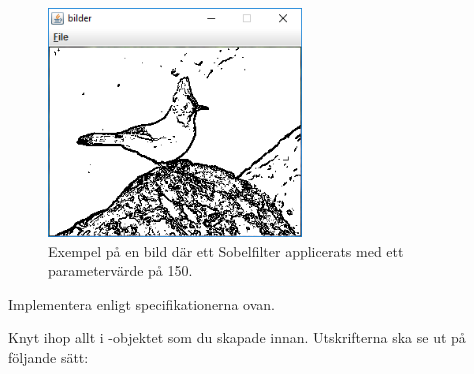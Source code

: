 \begin{figure}[H]
\begin{center}
\includegraphics[width=0.6\textwidth]{../img/w12-assignment-photo/sobeljay.png}
\caption { Exempel på en bild där ett Sobelfilter applicerats med ett parametervärde på 150.}
\label{fig:photo:sobelfilter:sobel}
\end{center}
\end{figure}


\Task Implementera  enligt specifikationerna ovan.

\Task Knyt ihop allt i -objektet som du skapade innan. Utskrifterna ska se ut på följande sätt:\newline

